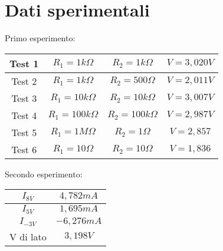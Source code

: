     \section{Dati sperimentali}
    \begin{center}
        Primo esperimento: \par
    \begin{tabular}{|c|c|c|c|}
        \hline
        Test 1 & $R_1 =1k\Omega$ & $R_2=1k\Omega$ & $V=3,020V$\\
        \hline
        Test 2 & $R_1 =1k\Omega$ & $R_2=500\Omega$ & $V=2,011V$\\
        \hline
        Test 3 & $R_1 =10k\Omega$ & $R_2=10k\Omega$ & $V=3,007V$\\
        \hline
        Test 4 & $R_1 =100k\Omega$ & $R_2=100k\Omega$ & $V=2,987V$\\
        \hline
        Test 5 & $R_1 =1M\Omega$ & $R_2=1\Omega$ & $V=2,857$\\
        \hline
        Test 6 & $R_1 =10\Omega$ & $R_2=10\Omega$ & $V=1,836$\\
        \hline
    
    \end{tabular}
    \end{center}
    
    \begin{center}
        Secondo esperimento: \par
    \begin{tabular}{|c|c|}
        \hline
        $I_{8V}$ & $4,782 mA$\\
        \hline
        $I_{5V}$ & $1,695 mA$\\
        \hline
        $I_{-3V}$ & $-6,276 mA$\\
        \hline
        V di lato & $3,198 V$\\
        \hline
    
    \end{tabular}
    \end{center}


    
